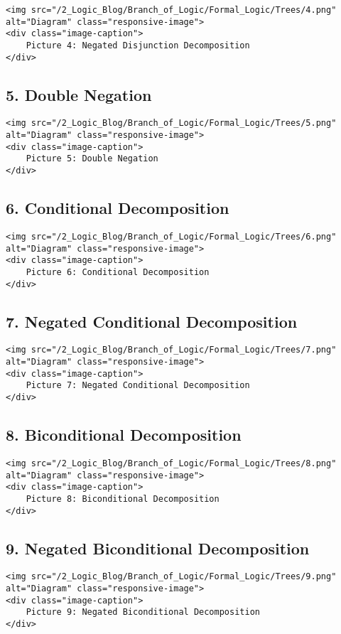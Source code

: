 \begin{verbatim}
<img src="/2_Logic_Blog/Branch_of_Logic/Formal_Logic/Trees/4.png" alt="Diagram" class="responsive-image">
<div class="image-caption">
    Picture 4: Negated Disjunction Decomposition
</div>
\end{verbatim}

\subsection{5. Double Negation}\label{double-negation}

\begin{verbatim}
<img src="/2_Logic_Blog/Branch_of_Logic/Formal_Logic/Trees/5.png" alt="Diagram" class="responsive-image">
<div class="image-caption">
    Picture 5: Double Negation
</div>
\end{verbatim}

\subsection{6. Conditional
Decomposition}\label{conditional-decomposition}

\begin{verbatim}
<img src="/2_Logic_Blog/Branch_of_Logic/Formal_Logic/Trees/6.png" alt="Diagram" class="responsive-image">
<div class="image-caption">
    Picture 6: Conditional Decomposition
</div>
\end{verbatim}

\subsection{7. Negated Conditional
Decomposition}\label{negated-conditional-decomposition}

\begin{verbatim}
<img src="/2_Logic_Blog/Branch_of_Logic/Formal_Logic/Trees/7.png" alt="Diagram" class="responsive-image">
<div class="image-caption">
    Picture 7: Negated Conditional Decomposition
</div>
\end{verbatim}

\subsection{8. Biconditional
Decomposition}\label{biconditional-decomposition}

\begin{verbatim}
<img src="/2_Logic_Blog/Branch_of_Logic/Formal_Logic/Trees/8.png" alt="Diagram" class="responsive-image">
<div class="image-caption">
    Picture 8: Biconditional Decomposition
</div>
\end{verbatim}

\subsection{9. Negated Biconditional
Decomposition}\label{negated-biconditional-decomposition}

\begin{verbatim}
<img src="/2_Logic_Blog/Branch_of_Logic/Formal_Logic/Trees/9.png" alt="Diagram" class="responsive-image">
<div class="image-caption">
    Picture 9: Negated Biconditional Decomposition
</div>
\end{verbatim}
